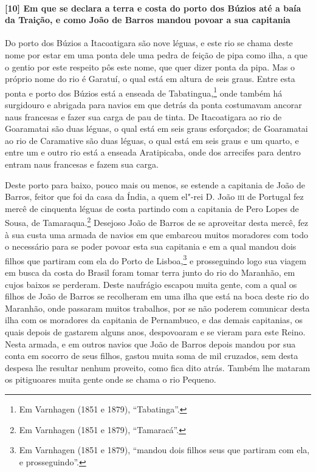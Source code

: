 \begin{linenumbers}
\paragraph{[10] Em que se declara a terra e costa do porto dos Búzios até a baía da Traição,
e como João de Barros mandou povoar a sua capitania} \quad
Do porto dos Búzios a Itacoatigara são nove léguas, e este rio se chama deste nome por
estar em uma ponta dele uma pedra de feição de pipa como ilha, a que o gentio por este
respeito pôs este nome, que quer dizer ponta da pipa. Mas o próprio nome do rio é Garatuí,
o qual está em altura de seis graus. Entre esta ponta e porto dos Búzios está a enseada de
Tabatingua,\footnote{ Em Varnhagen (1851 e 1879), ``Tabatinga''.} onde também há
surgidouro e abrigada para navios em que detrás da ponta costumavam ancorar naus francesas
e fazer sua carga de pau de tinta. De Itacoatigara ao rio de Goaramatai são duas léguas, o
qual está em seis graus esforçados; de Goaramatai ao rio de Caramative são duas léguas, o
qual está em seis graus e um quarto, e entre um e outro rio está a enseada Aratipicaba,
onde dos arrecifes para dentro entram naus francesas e fazem sua carga.

Deste porto para baixo, pouco mais ou menos, se estende a capitania de João de Barros,
feitor que foi da casa da Índia, a quem el"-rei D. João \textsc{iii} de Portugal fez mercê
de cinquenta léguas de costa partindo com a capitania de Pero Lopes de Sousa, de
Tamaraqua.\footnote{ Em Varnhagen (1851 e 1879), ``Tamaracá''.} Desejoso João de Barros de
se aproveitar desta mercê, fez à sua custa uma armada de navios em que embarcou muitos
moradores com todo o necessário para se poder povoar esta sua capitania e em a qual mandou
dois filhos que partiram com ela do Porto de Lisboa,\footnote{ Em Varnhagen (1851 e 1879),
``mandou dois filhos seus que partiram com ela, e prosseguindo''.} e prosseguindo logo sua
viagem em busca da costa do Brasil foram tomar terra junto do rio do Maranhão, em cujos
baixos se perderam. Deste naufrágio escapou muita gente, com a qual os filhos de João de
Barros se recolheram em uma ilha que está na boca deste rio do Maranhão, onde passaram
muitos trabalhos, por se não poderem comunicar desta ilha com os moradores da capitania de
Pernambuco, e das demais capitanias, os quais depois de gastarem alguns anos, despovoaram
e se vieram para este Reino. Nesta armada, e em outros navios que João de Barros depois
mandou por sua conta em socorro de seus filhos, gastou muita soma de mil cruzados, sem
desta despesa lhe resultar nenhum proveito, como fica dito atrás. Também lhe mataram os
pitiguoares muita gente onde se chama o rio Pequeno.


\end{linenumbers}
